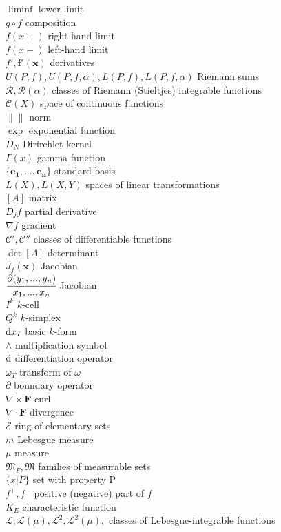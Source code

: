 $\liminf $ lower limit \\
$g \circ f$ composition \\
$f(x+)$ right-hand limit \\
$f(x-)$ left-hand limit \\
$f', \mathbf{f'(x)}$ derivatives \\
$U(P,f), U(P,f,\alpha), L(P,f), L(P,f,\alpha)$ Riemann sums \\
$\mathscr{R}, \mathscr{R}(\alpha)$ classes of Riemann (Stieltjes) integrable functions \\
$\mathscr{C}(X)$ space of continuous functions \\
$\left\|  \right\| $ norm \\
$\exp $ exponential function \\
$D_N$ Dirirchlet kernel \\
$\Gamma(x)$ gamma function \\
$\{\mathbf{e_1,...,e_n}\}$ standard basis \\
$L(X), L(X,Y)$ spaces of linear transformations \\
$[A]$ matrix \\
$D_j f$ partial derivative \\
$\nabla f$ gradient \\
$\mathscr{C}', \mathscr{C}''$ classes of differentiable functions \\
$\det [A]$ determinant \\
$J_f (\mathbf{x})$ Jacobian \\
$\cfrac{\partial (y_1,...,y_n)}{x_1,...,x_n}$ Jacobian \\
$I^k$ $k$-cell \\
$Q^k$ $k$-simplex \\
$\d x_I$ basic $k$-form \\
$\wedge$ multiplication symbol \\
$\d$ differentiation operator \\
$\omega_T$ transform of $\omega$ \\
$\partial$ boundary operator \\
$\nabla \times \mathbf{F}$ curl \\
$\nabla \cdot \mathbf{F}$ divergence \\
$\mathscr{E}$ ring of elementary sets \\
$m$ Lebesgue measure \\
$\mu$ measure \\
$\mathfrak{M}_F, \mathfrak{M}$ families of measurable sets \\
$\{x|P\}$ set with property P \\
$f^+, f^-$ positive (negative) part of $f$ \\
$K_E$ characteristic function \\
$\mathscr{L}, \mathscr{L}(\mu), \mathscr{L}^2, \mathscr{L}^2(\mu),$ classes of Lebesgue-integrable functions 

\onecolumn
